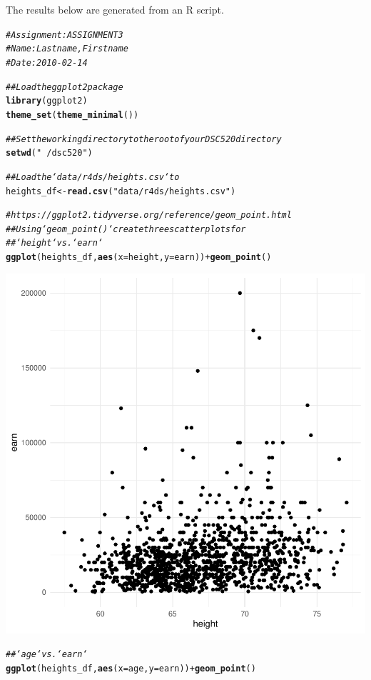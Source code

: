 \documentclass{article}\usepackage[]{graphicx}\usepackage[]{xcolor}
\makeatletter
\newcommand{\hlstr}[1]{\textcolor[rgb]{0.192,0.494,0.8}{#1}}%
\newcommand{\hlcom}[1]{\textcolor[rgb]{0.678,0.584,0.686}{\textit{#1}}}%
\newcommand{\hlopt}[1]{\textcolor[rgb]{0,0,0}{#1}}%
\newcommand{\hlstd}[1]{\textcolor[rgb]{0.345,0.345,0.345}{#1}}%
\newcommand{\hlkwb}[1]{\textcolor[rgb]{0.69,0.353,0.396}{#1}}%
\newcommand{\hlkwc}[1]{\textcolor[rgb]{0.333,0.667,0.333}{#1}}%
\newcommand{\hlkwd}[1]{\textcolor[rgb]{0.737,0.353,0.396}{\textbf{#1}}}%
\newenvironment{kframe}{%
 \def\at@end@of@kframe{}%
 \ifinner\ifhmode%
  \def\at@end@of@kframe{\end{minipage}}%
  \begin{minipage}{\columnwidth}%
 \fi\fi%
 \def\FrameCommand##1{\hskip\@totalleftmargin \hskip-\fboxsep
 \colorbox{shadecolor}{##1}\hskip-\fboxsep
     \hskip-\linewidth \hskip-\@totalleftmargin \hskip\columnwidth}%
 \MakeFramed {\advance\hsize-\width
   \@totalleftmargin\z@ \linewidth\hsize
   \@setminipage}}%
 {\par\unskip\endMakeFramed%
 \at@end@of@kframe}
\newenvironment{knitrout}{}{} %
\makeatother
\begin{document}
The results below are generated from an R script.

\begin{knitrout}
\color{fgcolor}\begin{kframe}
\begin{alltt}
\hlcom{# Assignment: ASSIGNMENT 3}
\hlcom{# Name: Lastname, Firstname}
\hlcom{# Date: 2010-02-14}

\hlcom{## Load the ggplot2 package}
\hlkwd{library}\hlstd{(ggplot2)}
\hlkwd{theme_set}\hlstd{(}\hlkwd{theme_minimal}\hlstd{())}

\hlcom{## Set the working directory to the root of your DSC 520 directory}
\hlkwd{setwd}\hlstd{(}\hlstr{"~/dsc520"}\hlstd{)}

\hlcom{## Load the `data/r4ds/heights.csv` to}
\hlstd{heights_df} \hlkwb{<-} \hlkwd{read.csv}\hlstd{(}\hlstr{"data/r4ds/heights.csv"}\hlstd{)}

\hlcom{# https://ggplot2.tidyverse.org/reference/geom_point.html}
\hlcom{## Using `geom_point()` create three scatterplots for}
\hlcom{## `height` vs. `earn`}
\hlkwd{ggplot}\hlstd{(heights_df,} \hlkwd{aes}\hlstd{(}\hlkwc{x}\hlstd{=height,} \hlkwc{y}\hlstd{=earn))} \hlopt{+} \hlkwd{geom_point}\hlstd{()}
\end{alltt}
\end{kframe}

{\centering \includegraphics[width=.6\linewidth]{figure/assignment-03-TangXin-Rnwauto-report-1} 

}


\begin{kframe}\begin{alltt}
\hlcom{## `age` vs. `earn`}
\hlkwd{ggplot}\hlstd{(heights_df,} \hlkwd{aes}\hlstd{(}\hlkwc{x}\hlstd{=age,} \hlkwc{y}\hlstd{=earn))} \hlopt{+} \hlkwd{geom_point}\hlstd{()}
\end{alltt}
\end{kframe}


\end{knitrout}
\end{document}
